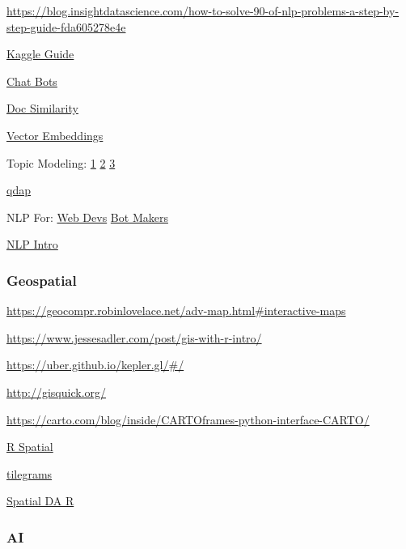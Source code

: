 \documentclass[]{book}
\begin{document}
\url{https://blog.insightdatascience.com/how-to-solve-90-of-nlp-problems-a-step-by-step-guide-fda605278e4e}

\href{https://t.co/Zcnd7EJKsn}{Kaggle Guide}

\href{https://rasa.ai/}{Chat Bots}

\href{http://brandonrose.org/clustering}{Doc Similarity}

\href{http://bookworm.benschmidt.org/posts/2015-10-25-Word-Embeddings.html}{Vector
Embeddings}

Topic Modeling:
\href{http://alexperrier.github.io/jekyll/update/2015/09/04/topic-modeling-of-twitter-followers.html}{1}
\textbar{}
\href{http://chdoig.github.io/pytexas2015-topic-modeling/\#/}{2}
\textbar{}
\href{https://www.cs.princeton.edu/~blei/topicmodeling.html}{3}

\href{https://trinker.github.io/qdap/vignettes/qdap_vignette.html}{qdap}

NLP For:
\href{http://blog.algorithmia.com/natural-language-processing-algorithms-web-developers/}{Web
Devs} \textbar{}
\href{https://stanfy.com/blog/advanced-natural-language-processing-tools-for-bot-makers/}{Bot
Makers}

\href{http://blog.algorithmia.com/introduction-natural-language-processing-nlp/}{NLP
Intro}

\subsubsection{Geospatial}\label{geospatial}

\url{https://geocompr.robinlovelace.net/adv-map.html\#interactive-maps}

\url{https://www.jessesadler.com/post/gis-with-r-intro/}

\url{https://uber.github.io/kepler.gl/\#/}

\url{http://gisquick.org/}

\url{https://carto.com/blog/inside/CARTOframes-python-interface-CARTO/}

\href{http://www.rspatial.org/analysis/rst/2-scale_distance.html}{R
Spatial}

\href{https://pitchinteractiveinc.github.io/tilegrams/}{tilegrams}

\href{https://data.cdrc.ac.uk/tutorial/an-introduction-to-spatial-data-analysis-and-visualisation-in-r}{Spatial
DA R}

\subsubsection{AI}\label{ai}
\end{document}
